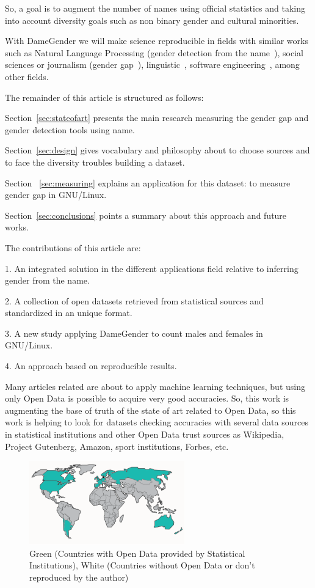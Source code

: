 \documentclass[a4paper]{article}
\begin{document}
So, a goal is to augment the number of names using official statistics
and taking into account diversity goals such as non binary gender and
cultural minorities.

With DameGender we will make science reproducible\cite{peng2011reproducible}
in fields with similar works such as Natural Language Processing
(gender detection from the name~\cite{sun2019mitigating}), social
sciences or journalism (gender
gap~\cite{holman2018gender,mislove2011understanding,niemi2017gendered,de2014genero}),
linguistic~\cite{hutson2016gender,al2009socio},
software engineering~\cite{vasilescu2012gender}, among other fields.

The remainder of this article is structured as follows:

Section~\ref{sec:stateofart} presents the main research measuring the
gender gap and gender detection tools using name.

Section~\ref{sec:design} gives vocabulary and philosophy about to
choose sources and to face the diversity troubles building a dataset.

Section ~\ref{sec:measuring} explains an application for this
dataset: to measure gender gap in GNU/Linux.

Section~\ref{sec:conclusions} points a summary about this approach and
future works.

The contributions of this article are:

1. An integrated solution in the different applications field relative
to inferring gender from the name.

2. A collection of open datasets retrieved from statistical sources
and standardized in an unique format.

3. A new study applying DameGender to count males and females in
GNU/Linux.

4. An approach based on reproducible results.

Many articles related are about to apply machine learning techniques,
but using only Open Data is possible to acquire very good accuracies.
So, this work is augmenting the base of truth of the state of art
related to Open Data, so this work is helping to look for datasets
checking accuracies with several data sources in statistical
institutions and other Open Data trust sources as Wikipedia,
Project Gutenberg, Amazon, sport institutions, Forbes, etc.

\begin{figure}
  \centering
  \includegraphics[width=0.6\textwidth]{images/Simple_world_map_edit.pdf}
  \caption[Caption for LOF]{Green (Countries with Open Data provided by Statistical Institutions), White (Countries without Open Data or don't reproduced by the author)}
\end{figure}
\end{document}
